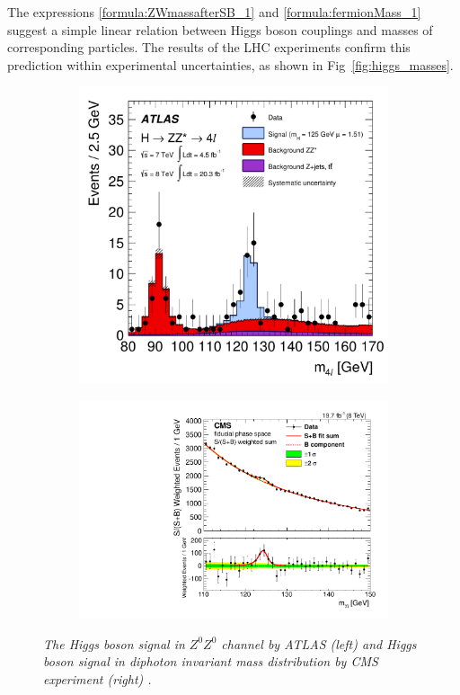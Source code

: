 The expressions \ref{formula:ZWmassafterSB_1} and \ref{formula:fermionMass_1} suggest a simple linear relation between Higgs boson couplings and masses of corresponding particles. The results of the LHC experiments confirm this prediction within experimental uncertainties, as shown in Fig~\ref{fig:higgs_masses}.


\begin{figure}
\centering
\begin{subfigure}{0.5\textwidth}
\centering
\includegraphics[width=.90\linewidth]{graphics/m4l_80_170_allYear_125.pdf}

\end{subfigure}%
\begin{subfigure}{0.5\textwidth}
\centering
\includegraphics[width=.90\linewidth]{graphics/CMS-HIG-14-016_Figure_003.pdf}

\end{subfigure}
    \caption{\sl The Higgs boson signal in $Z^0Z^0$ channel by ATLAS (left) \cite{bib:HiggsAtlas2} and Higgs boson signal in diphoton invariant mass distribution by CMS experiment (right) \cite{bib:HiggsCms2}.}
    \label{fig:diphoton}
\end{figure}

